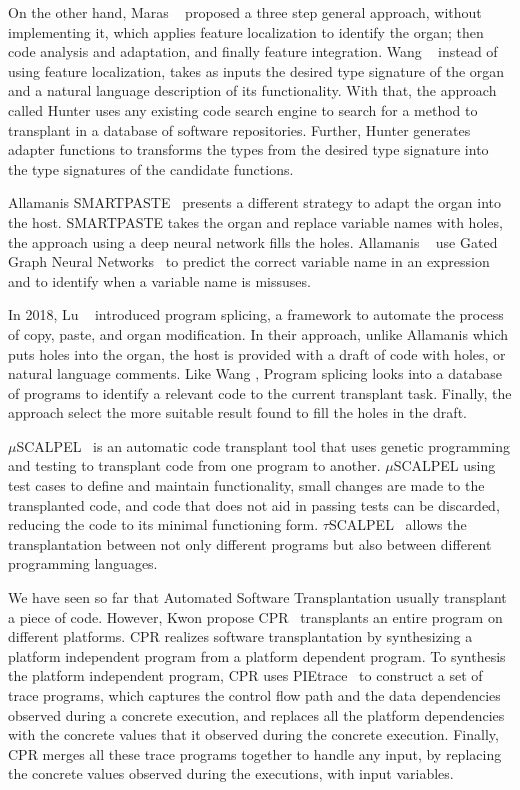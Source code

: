 On the other hand, Maras \etal~\cite{maras2015towards} proposed a three step general approach, without implementing it, which applies feature localization to identify the organ; then code analysis and adaptation, and finally feature integration. Wang \etal~\cite{wang2016hunter} instead of using feature localization, takes as inputs the desired type signature of the organ and a natural language description of its functionality. With that, the approach called Hunter uses any existing code search engine to search for a method to transplant in a database of software repositories. Further, Hunter generates adapter functions to transforms the types from the desired type signature into the type signatures of the candidate functions.

Allamanis \etal SMARTPASTE~\cite{allamanis2017smartpaste} presents a different strategy to adapt the organ into the host. SMARTPASTE takes the organ and replace variable names with holes, the approach using a deep neural network fills the holes. Allamanis \etal~\cite{allamanis2017smartpaste} use Gated Graph Neural Networks~\cite{li2015gated} to predict the correct variable name in an expression and to identify when a variable name is missuses.

In 2018, Lu \etal~\cite{lu2018program} introduced program splicing, a framework to automate the process of copy, paste, and organ modification. In their approach, unlike Allamanis \etal which puts holes into the organ, the host is provided with a draft of code with holes, or natural language comments. Like Wang \etal, Program splicing looks into a database of programs to identify a relevant code to the current transplant task. Finally, the approach select the more suitable result found to fill the holes in the draft.

$\mu$SCALPEL~\cite{barr2015automated} is an automatic code transplant tool that uses genetic programming and testing to transplant code from one program to another. $\mu$SCALPEL using test cases to define and maintain functionality, small changes are made to the transplanted code, and code that does not aid in passing tests can be discarded, reducing the code to its minimal functioning form. $\tau$SCALPEL~\cite{marginean2021automated} allows the transplantation between not only different programs but also between different programming languages. 

We have seen so far that Automated Software Transplantation usually transplant a piece of code. However, Kwon \etal propose CPR~\cite{kwon2017cpr} transplants an entire program on different platforms. CPR realizes software transplantation by synthesizing a platform independent program from a platform dependent program. To synthesis the platform independent program, CPR uses PIEtrace~\cite{kwon2013pietrace} to construct a set of trace programs, which captures the control flow path and the data dependencies observed during a concrete execution, and replaces all the platform dependencies with the concrete values that it observed during the concrete execution. Finally, CPR merges all these trace programs together to handle any input, by replacing the concrete values observed during the executions, with input variables. 

